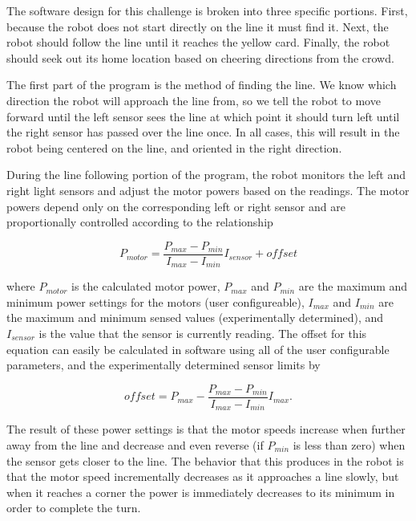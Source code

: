 \documentclass[journal]{IEEEtran}
\begin{document}
The software design for this challenge is broken into three specific portions. First, because the robot does not start directly on the line it must find it. Next, the robot should follow the line until it reaches the yellow card. Finally, the robot should seek out its home location based on cheering directions from the crowd.

The first part of the program is the method of finding the line. We know which direction the robot will approach the line from, so we tell the robot to move forward until the left sensor sees the line at which point it should turn left until the right sensor has passed over the line once. In all cases, this will result in the robot being centered on the line, and oriented in the right direction. 

During the line following portion of the program, the robot monitors the left and right light sensors and adjust the motor powers based on the readings. The motor powers depend only on the corresponding left or right sensor and are proportionally controlled according to the relationship 

\begin{equation}\label{E.motor_speed}
    P_{motor} = \frac{P_{max}-P_{min}}{I_{max}-I_{min}}I_{sensor} + offset
\end{equation}

where $P_{motor}$ is the calculated motor power, $P_{max}$ and $P_{min}$ are the maximum and minimum power settings for the motors (user configureable), $I_{max}$ and $I_{min}$ are the maximum and minimum sensed values (experimentally determined), and $I_{sensor}$ is the value that the sensor is currently reading. The offset for this equation can easily be calculated in software using all of the user configurable parameters, and the experimentally determined sensor limits by

\begin{equation}\label{E.motor_speed}
    offset = P_{max} - \frac{P_{max}-P_{min}}{I_{max}-I_{min}}I_{max}.
\end{equation}

The result of these power settings is that the motor speeds increase when further away from the line and decrease and even reverse (if $P_{min}$ is less than zero) when the sensor gets closer to the line. The behavior that this produces in the robot is that the motor speed incrementally decreases as it approaches a line slowly, but when it reaches a corner the power is immediately decreases to its minimum in order to complete the turn. 
\end{document}
